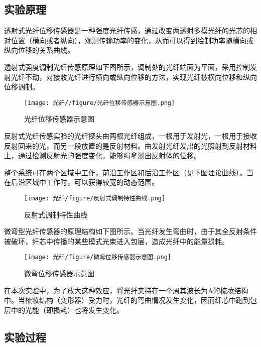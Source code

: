 \documentclass[UTF8]{ctexart}
\begin{document}
\subsection{实验原理}
\par
透射式光纤位移传感器是一种强度光纤传感，通过改变两透射多模光纤的光芯的相对位置（横向或者纵向），观测传输功率的变化，从而可以得到绘制功率随横向或纵向位移的关系曲线。
\par
透射式强度调制光纤传感原理如下图所示，调制处的光纤端面为平面，采用控制发射光纤不动，对接收光纤进行横向或纵向位移的方法，实现光纤被横向位移和纵向位移调制。
\begin{figure}[!h]
    \centering
    \texttt{[image: 光纤//figure/光纤位移传感器示意图.png]}
    \caption{光纤位移传感器示意图}
    \label{img1}
\end{figure}
\vspace{1em}

\par
反射式光纤传感实验的光纤探头由两根光纤组成，一根用于发射光，一根用于接收反射回来的光，而另一段放置的是反射材料。由发射光纤发出的光照射到反射材料上，通过检测反射光的强度变化，能够缉拿测出反射体的位移。
\par
整个系统可在两个区域中工作，前沿工作区和后沿工作区（见下图理论曲线）。当在后沿区域中工作时，可以获得较宽的动态范围。
\begin{figure}[!h]
    \centering
    \texttt{[image: 光纤/figure/反射式调制特性曲线.png]}
    \caption{反射式调制特性曲线}
\end{figure}
\vspace{1em}

\par
微弯型光纤传感器的原理结构如下图所示。当光纤发生弯曲时，由于其全反射条件被破环，纤芯中传播的某些模式光束进入包层，造成光纤中的能量损耗。
\begin{figure}[!h]
    \centering
    \texttt{[image: 光纤/figure/微弯位移传感器示意图.png]}
    \caption{微弯位移传感器示意图}
\end{figure}
\par
在本次实验中，为了放大这种效应，将光纤夹持在一个周其波长为A的梳妆结构中。当梳妆结构（变形器）受力时，光纤的弯曲情况发生变化，因而纤芯中跑到包层中的光能（即损耗）也将发生变化。
\vspace{2em}

\subsection{实验过程}
\end{document}
